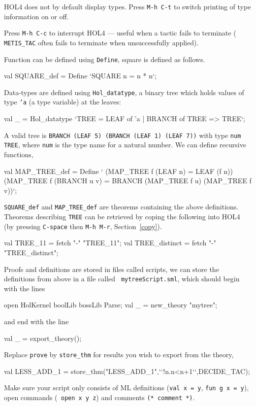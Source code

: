 \documentclass[a4paper,10pt]{article}
\begin{document}

HOL4 does not by default display types. Press {\tt M-h C-t} to switch
printing of type information on or off.


Press {\tt M-h C-c} to interrupt HOL4 --- useful when a tactic fails to terminate
(\eg{} {\tt\small METIS\_TAC} often fails to terminate when unsuccessfully applied).


Function can be defined using {\tt Define}, \eg{} square is defined as follows.
\begin{code}
val SQUARE_def = Define `SQUARE n = n * n`;
\end{code}

\noindent
Data-types are defined using {\tt Hol\_datatype}, \eg{} a binary tree
which holds values of type {\tt 'a} (a type variable) at the leaves:
\begin{code}
val _ = Hol_datatype `TREE = LEAF of 'a | BRANCH of TREE => TREE`;
\end{code}

\noindent
A valid tree is \eg{} {\tt BRANCH (LEAF 5) (BRANCH (LEAF 1) (LEAF 7))}
with type {\tt num TREE}, where {\tt  num} is the type name for a natural
number. We can define recursive functions, \eg{}
\begin{code}
val MAP_TREE_def = Define `
  (MAP_TREE f (LEAF n) = LEAF (f n)) \conj{}
  (MAP_TREE f (BRANCH u v) = BRANCH (MAP_TREE f u) (MAP_TREE f v))`;
\end{code}
{\tt  SQUARE\_def} and {\tt  MAP\_TREE\_def} are theorems containing the
above definitions. Theorems describing {\tt  TREE} can be retrieved by coping
the following into HOL4 (by pressing {\tt C-space} then {\tt M-h M-r}, Section~\ref{copy}).
\begin{code}
val TREE_11 = fetch "-" "TREE_11";
val TREE_distinct = fetch "-" "TREE_distinct";
\end{code}


Proofs and definitions are stored in files called scripts, \eg{} we
can store the definitions from above in a file called {\tt
  mytreeScript.sml}, which should begin with the lines
\begin{code}
open HolKernel boolLib bossLib Parse;
val _ = new_theory "mytree";
\end{code}
and end with the line
\begin{code}
val _ = export_theory();
\end{code}
Replace {\tt prove} by {\tt store\_thm} for results you
wish to export from the theory, \eg{}
\begin{code}
val LESS_ADD_1 = store_thm("LESS_ADD_1",{`}`!n.n<n+1{`}`,DECIDE_TAC);
\end{code}
Make sure your script only consists of ML definitions ({\tt \small val
  x = y}, {\tt \small fun g x = y}), open commands ({\tt \small
  open x y z}) and comments {\tt \small (* comment *)}.
\end{document}
